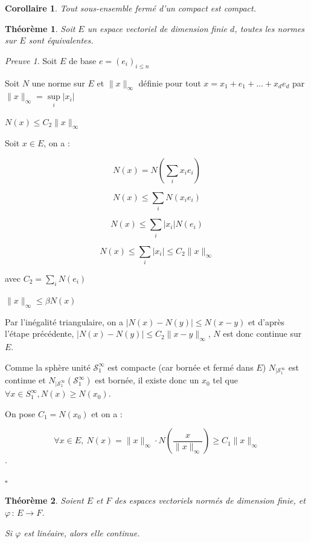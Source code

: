 \documentclass[]{article}
\newtheorem{mythm}{Théorème}
\newtheorem{mycor}{Corollaire}
\theoremstyle{remark}
\newtheorem{myproof}{Preuve}
\theoremstyle{definition}
\newcommand{\cqfd}{
	\hfill$\square$
}
\newcommand{\funcshort}[3]{
#1 \, : \, #2 \longrightarrow #3
}
\newenvironment{proofpart}[1]{
	\noindent
	{\textbf{\boldmath #1}}
}{
	\checkmark
}
\begin{document}
\begin{mycor}
	Tout sous-ensemble fermé d'un compact est compact.
\end{mycor}

\begin{mythm}
	Soit $E$ un espace vectoriel de dimension finie $d$, toutes les normes sur $E$ sont équivalentes.
\end{mythm}

\begin{myproof}
	Soit $E$ de base $e=(e_i)_{i \leqslant n}$
	
	Soit $N$ une norme sur $E$ et $\|x\|_{\infty}$ définie pour tout $x=x_1 +e_1 + ... + x_d e_d$ par $\|x\|_{\infty} = \sup\limits_i |x_i|$
	
	\begin{proofpart}{$N(x) \leqslant C_2 \|x\|_\infty$}
		Soit $x \in E$, on a :
		
		$$N(x) = N\left(\sum_{i} x_i e_i\right)$$

		$$N(x) \leqslant \sum_{i} N(x_i e_i)$$

		$$N(x) \leqslant \sum_{i} |x_i| N(e_i)$$

		$$N(x) \leqslant \sum_{i} |x_i| \leqslant C_2 \|x\|_{\infty}$$
		
		avec $C_2 = \sum_i N(e_i)$
	\end{proofpart}
	
	\begin{proofpart}{$\|x\|_\infty \leqslant \beta N(x)$}
		Par l'inégalité triangulaire, on a $|N(x)-N(y)| \leqslant N(x-y)$ et d'après l'étape précédente, $|N(x) - N(y)| \leqslant C_2 \|x-y\|_{\infty}$, $N$ est donc continue sur $E$.
		
		Comme la sphère unité $\mathcal{S}_1^{\infty}$ est compacte (car bornée et fermé dans $E$) $N_{|\mathcal{S}_1^{\infty}}$ est continue et $N_{|\mathcal{S}_1^{\infty}}(\mathcal{S}_1^{\infty})$ est bornée, il existe donc un $x_0$ tel que $\forall x \in S^{\infty}_1, N(x) \geqslant N(x_0)$.
		
		On pose $C_1=N(x_0)$ et on a :
		
		$$\forall x \in E, ~ N(x) = \|x\|_{\infty} \cdot  N\left(\frac{x}{\|x\|_{\infty}}\right) \geqslant C_1 \|x\|_{\infty}$$.
	\end{proofpart}
	
	\cqfd
\end{myproof}

\begin{mythm}
	Soient $E$ et $F$ des espaces vectoriels normés de dimension finie, et $\funcshort{\varphi}{E}{F}$.
	
	Si $\varphi$ est linéaire, alors elle continue.
\end{mythm}
\end{document}
